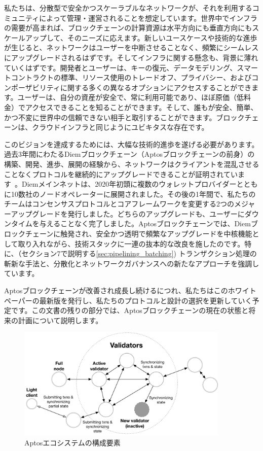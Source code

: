 \documentclass{article}
\begin{document}
私たちは、分散型で安全かつスケーラブルなネットワークが、それを利用するコミュニティによって管理・運営されることを想定しています。世界中でインフラの需要が高まれば、ブロックチェーンの計算資源は水平方向にも垂直方向にもスケールアップして、そのニーズに応えます。新しいユースケースや技術的な進歩が生じると、ネットワークはユーザーを中断させることなく、頻繁にシームレスにアップグレードされるはずです。そしてインフラに関する懸念も、背景に薄れていくはずです。開発者とユーザーは、キーの復元、データモデリング、スマートコントラクトの標準、リソース使用のトレードオフ、プライバシー、およびコンポーザビリティに関する多くの異なるオプションにアクセスすることができます。ユーザーは、自分の資産が安全で、常に利用可能であり、ほぼ原価（低料金）でアクセスできることを知ることができます。そして、誰もが安全、簡単、かつ不変に世界中の信頼できない相手と取引することができます。ブロックチェーンは、クラウドインフラと同じようにユビキタスな存在です。

このビジョンを達成するためには、大幅な技術的進歩を遂げる必要があります。過去3年間にわたるDiemブロックチェーン（Aptosブロックチェーンの前身）の構築、開発、進歩、展開の経験から、ネットワークはクライアントを混乱させることなくプロトコルを継続的にアップグレードできることが証明されています~\cite{diem_blockchain}。Diemメインネットは、2020年初頭に複数のウォレットプロバイダーとともに10数社のノードオペレーターに展開されました。その後の1年間で、私たちのチームはコンセンサスプロトコルとコアフレームワークを変更する2つのメジャーアップグレードを発行しました。どちらのアップグレードも、ユーザーにダウンタイムを与えることなく完了しました。Aptosブロックチェーンでは、Diemブロックチェーンに触発され、安全かつ透明で頻繁なアップグレードを中核機能として取り入れながら、技術スタックに一連の抜本的な改良を施したのです。特に、（セクション7で説明する\ref{sec:pipelining_batching}) トランザクション処理の斬新な手法と、分散化とネットワークガバナンスへの新たなアプローチを強調しています。

Aptosブロックチェーンが改善され成長し続けるにつれ、私たちはこのホワイトペーパーの最新版を発行し、私たちのプロトコルと設計の選択を更新していく予定です。この文書の残りの部分では、Aptosブロックチェーンの現在の状態と将来の計画について説明します。

\begin{figure}
\centering
\includegraphics[width=0.9\textwidth]{validators.pdf}
\caption{\label{fig:aptos_ecosystem}Aptosエコシステムの構成要素}
\end{figure}
\end{document}
